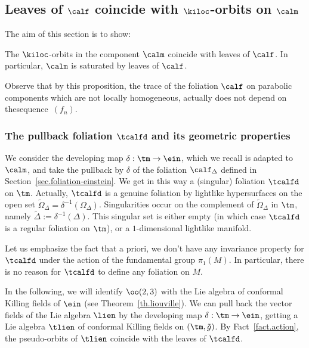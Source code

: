 \subsection{Leaves of \texorpdfstring{$\calf$}{calf} coincide with \texorpdfstring{$\kiloc$}{kiloc}-orbits on \texorpdfstring{$\calm$}{calm}}\label{sec.calfetkill}
The aim of this section is to show:

\begin{prop}\label{prop.coincidencecalf}
The $\kiloc$-orbits in the component $\calm$ coincide with leaves of $\calf$. In particular, $\calm$ is saturated by leaves of $\calf$.
\end{prop}

Observe that by this proposition, the trace of the foliation ${\calf}$ on parabolic components which are not locally homogeneous, actually does not depend on the\linebreak sequence~$(f_n)$.

\subsubsection{The pullback foliation \texorpdfstring{$\tcalfd$}{tcalfd} and its geometric properties}\label{sec.pulbackfolia}

We consider the developing map $\delta : \tm \to \ein$, which we recall is adapted to $\calm$, and take the pullback by $\delta$ of the foliation ${\calf}_{\Delta}$ defined in Section~\ref{sec.foliation-einstein}. We get in this way a (singular) foliation $\tcalfd$ on $\tm$. Actually, $\tcalfd$ is a genuine foliation by lightlike hypersurfaces on the open set $\tilde{\Omega}_{\Delta}=\delta^{-1}(\Omega_{\Delta})$. Singularities occur on the complement of $\tilde{\Omega}_{\Delta}$ in $\tm$, namely $\tilde{\Delta}:=\delta^{-1}(\Delta)$. This singular set is either empty (in which case $\tcalfd$ is a regular foliation on $\tm$), or a $1$-dimensional lightlike manifold.

Let us emphasize the fact that a priori, we don't have any invariance property for $\tcalfd$ under the action of the fundamental group $\pi_1(M)$. In particular, there is no reason for $\tcalfd$ to define any foliation on $M$.

In the following, we will identify $\oo(2,3)$ with the Lie algebra of conformal Killing fields of $\ein$ (see Theorem~\ref{th.liouville}). We can pull back the vector fields of the Lie algebra $\lien$ by the developing map $\delta:\tm \to \ein$, getting a Lie algebra $\tlien$ of conformal Killing fields on $(\tm,{\tilde{g}})$. By Fact~\ref{fact.action}, the pseudo-orbits of $\tlien$ coincide with the leaves of $\tcalfd$.

